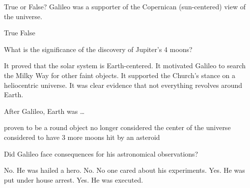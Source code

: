 \documentclass[addpoints]{exam}
\begin{document}
\begin{questions}
\question
True or False? Galileo was a supporter of the Copernican (sun-centered) view of the universe.

\begin{choices}
    \correctchoice True
    \choice False
\end{choices}

\question
What is the significance of the discovery of Jupiter's 4 moons?

\begin{choices}
    \choice It proved that the solar system is Earth-centered.
    \choice It motivated Galileo to search the Milky Way for other faint objects.
    \choice It supported the Church's stance on a heliocentric universe.
    \correctchoice It was clear evidence that not everything revolves around Earth.
\end{choices}

\question
After Galileo, Earth was \ldots

\begin{choices}
    \choice proven to be a round object
    \correctchoice no longer considered the center of the universe
    \choice considered to have 3 more moons
    \choice hit by an asteroid
\end{choices}

\question
Did Galileo face consequences for his astronomical observations?

\begin{choices}
    \choice No. He was hailed a hero.
    \choice No. No one cared about his experiments.
    \correctchoice Yes. He was put under house arrest. 
    \choice Yes. He was executed.
\end{choices}

\end{questions}
\end{document}
